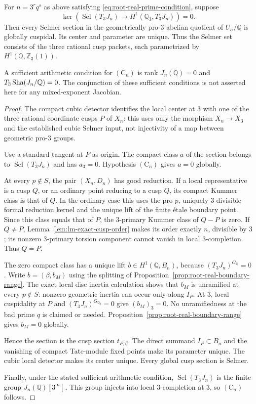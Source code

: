 \begin{theorem}
\label{thm:root-real-mixed-criterion}
For $n=3^r q^s$ as above satisfying
\eqref{eq:root-real-prime-condition}, suppose
\[
 \ker\!\left(
 \operatorname{Sel}(T_3J_n)
 \longrightarrow H^1(\mathbb Q_3,T_3J_n)
 \right)=0.
 \tag{$\mathrm C_n$}
\]
Then every Selmer section in the geometrically
pro-$3$ abelian quotient of $U_n/\mathbb Q$ is
globally cuspidal.  Its center and parameter are
unique.  Thus the Selmer set consists of the
three rational cusp packets, each parametrized
by $H^1(\mathbb Q,\mathbb Z_3(1))$.

A sufficient arithmetic condition for
$(\mathrm C_n)$ is rank $J_n(\mathbb Q)=0$
and $T_3\operatorname{Sha}(J_n/\mathbb Q)=0$.
The conjunction of these sufficient conditions is not asserted here
for any mixed-exponent Jacobian.
\end{theorem}
\begin{proof}
The compact cubic detector identifies the local
center at $3$ with one of the three rational
coordinate cusps $P$ of $X_n$: this uses only
the morphism $X_n\to X_3$ and the established
cubic Selmer input, not injectivity of a map
between geometric pro-$3$ groups.

Use a standard tangent at $P$ as origin.
The compact class $a$ of the section belongs
to $\operatorname{Sel}(T_3J_n)$ and has
$a_3=0$.  Hypothesis $(\mathrm C_n)$ gives
$a=0$ globally.

At every $p\notin S$, the pair $(X_n,D_n)$
has good reduction.  If a local representative
is a cusp $Q$, or an ordinary point reducing
to a cusp $Q$, its compact Kummer class is
that of $Q$.  In the ordinary case this uses
the pro-$p$, uniquely $3$-divisible formal
reduction kernel and the unique lift of the
finite \'etale boundary point.  Since this
class equals that of $P$, the $3$-primary
Kummer class of $Q-P$ is zero.
If $Q\ne P$, Lemma~\ref{lem:lm-exact-cusp-order}
makes its order exactly $n$, divisible by $3$;
its nonzero $3$-primary torsion component
cannot vanish in local $3$-completion.
Thus $Q=P$.

The zero compact class has a unique lift
$b\in H^1(\mathbb Q,B_n)$, because
$(T_3J_n)^{G_{\mathbb Q}}=0$.  Write
$b=(\beta,b_M)$ using the splitting of
Proposition~\ref{prop:root-real-boundary-range}.
The exact local disc inertia calculation
shows that $b_M$ is unramified at every
$p\notin S$: nonzero geometric inertia
can occur only along $I_P$.
At $3$, local cuspidality at $P$ and
$(T_3J_n)^{G_{\mathbb Q_3}}=0$ give
$(b_M)_3=0$.
No unramifiedness at the bad prime $q$
is claimed or needed.
Proposition~\ref{prop:root-real-boundary-range} gives
$b_M=0$ globally.

Hence the section is the cusp section
$t_{P,\beta}$.  The direct summand
$I_P\subset B_n$ and the vanishing of
compact Tate-module fixed points make
its parameter unique.  The cubic
local detector makes its center unique.
Every global cusp section is Selmer.

Finally, under the stated sufficient
arithmetic condition,
$\operatorname{Sel}(T_3J_n)$ is the finite
group $J_n(\mathbb Q)[3^\infty]$.
This group injects into local
$3$-completion at $3$, so
$(\mathrm C_n)$ follows.
\end{proof}

